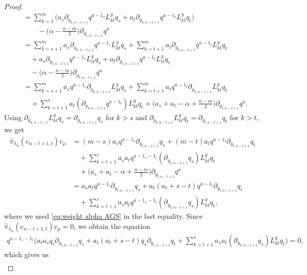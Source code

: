 \begin{proof}
\begin{align*}
  &= \sum_{k=1}^m \big(a_s\partial_{y_{k,n-t+1}}q^{a-1_s} L^y_{kt}q_s + a_t\partial_{y_{k,n-t+1}}q^{a-1_t} L^y_{kt}q_t \big) \\
  & \qquad - \big(\alpha - {\textstyle \frac{n-m}{2}} \big)\partial_{y_{t,n-t+1}}q^a \\
  & =\sum_{k=s+1}^m a_s\partial_{y_{k,n-t+1}}q^{a-1_s} L^y_{kt}q_s +\sum_{k=t+1}^m  a_t\partial_{y_{k,n-t+1}}q^{a-1_t} L^y_{kt}q_t \\
  & \quad +a_s\partial_{y_{t,n-t+1}}q^{a-1_s} L^y_{tt}q_s + a_t\partial_{y_{t,n-t+1}}q^{a-1_t} L^y_{tt}q_t \\
  & \quad - \big(\alpha - {\textstyle \frac{n-m}{2}} \big)\partial_{y_{t,n-t+1}}q^a \\
  &= \sum_{k=s+1}^m a_sq^{a-1_s} \partial_{y_{k,n-t+1}}L^y_{kt}q_s +\sum_{k=t+1}^m  a_tq^{a-1_t} \partial_{y_{k,n-t+1}}L^y_{kt}q_t \\
  & \quad + \sum_{k=t+1}^s a_t (\partial_{y_{k,n-t+1}}q^{a-1_t}) L^y_{kt}q_t +\big(a_s+a_t-\alpha+{\textstyle \frac{n-m}{2}}\big) \partial_{y_{t,n-t+1}}q^a.
\end{align*}
Using $\partial_{y_{k,n-t+1}}L^y_{kt}q_s=\partial_{y_{t,n-t+1}}q_s$ for $k>s$ and $\partial_{y_{k,n-t+1}}L^y_{kt}q_t=\partial_{y_{t,n-t+1}}q_t$ for $k>t$, we get
\begin{align*}
  \hat{\pi}_{\lambda_\alpha}\!(e_{n-t+1,t})v_\mu&= (m-s) a_sq^{a-1_s} \partial_{y_{t,n-t+1}}q_s +(m-t) a_tq^{a-1_t} \partial_{y_{t,n-t+1}}q_t \\
  & \quad + \sum_{k=t+1}^s a_s a_t q^{a-1_s-1_t}(\partial_{y_{k,n-t+1}}q_s) L^y_{kt}q_t \\
  & \quad +\big(a_s+a_t-\alpha+{\textstyle \frac{n-m}{2}}\big) \partial_{y_{t,n-t+1}}q^a  \\
  & = a_sa_t q^{a-1_s} \partial_{y_{t,n-t+1}} q_s +a_t(a_t+s-t) q^{a-1_t} \partial_{y_{t,n-t+1}} q_t \\
  & \quad + \sum_{k=t+1}^s a_s a_t q^{a-1_s-1_t}(\partial_{y_{k,n-t+1}}q_s) L^y_{kt}q_t,
\end{align*}
where we used \eqref{eq:weight alpha AGS} in the last equality. Since $\hat{\pi}_{\lambda_\alpha}\!(e_{n-t+1,t})v_\mu=0$, we obtain the equation
\begin{align*}
q^{a-1_s-1_t}\!\bigg(\!a_ta_s q_t \partial_{y_{t,n-t+1}} q_s\! +\! a_t(a_t+s-t)q_s \partial_{y_{t,n-t+1}} q_t\! +\! \sum_{k=t+1}^s a_sa_t (\partial_{y_{k,n-t+1}}q_s) L^y_{kt}q_t\!\bigg) \!=\! 0,
\end{align*}
which gives us
\begin{align*}

\end{align*}
\end{proof}
